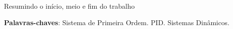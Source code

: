 \documentclass[
	12pt,				%
	openany,			%
	oneside,			%
	a4paper,			%
	english,			%
	french,				%
	spanish,			%
	brazil,				%
	]{abntex2}
\begin{document}

\frenchspacing 


\imprimircapa

\imprimirfolhaderosto*


{
\ABNTEXchapterfont



\setlength{\absparsep}{18pt} %
\begin{resumo}
 Resumindo o início, meio e fim do trabalho

 \noindent
 \textbf{Palavras-chaves}: Sistema de Primeira Ordem. PID. Sistemas Dinâmicos.
\end{resumo}

\listoffigures*
\cleardoublepage

\listoftables*
\cleardoublepage



\tableofcontents*
\cleardoublepage


}
\end{document}
